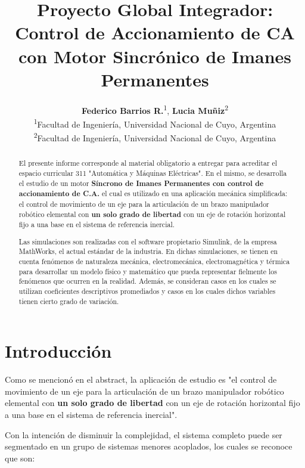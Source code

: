 \documentclass[blue,fullpaper]{ludusofficial}  %
\title{Proyecto Global Integrador: Control de Accionamiento de CA con Motor Sincrónico de Imanes Permanentes}
\author{%
    \textbf{Federico Barrios R.}\textsuperscript{1}, \textbf{Lucia Muñiz}\textsuperscript{2}\\[0.2cm]
    \mdseries\small\textsuperscript{1}Facultad de Ingeniería, Universidad Nacional de Cuyo, Argentina\\
    \small\textsuperscript{2}Facultad de Ingeniería, Universidad Nacional de Cuyo, Argentina \\
}
\begin{document}
\begin{abstract}
El presente informe corresponde al material obligatorio a entregar para acreditar el espacio curricular 311 "Automática y Máquinas Eléctricas". En el mismo, se desarrolla el estudio de un motor \textbf{Síncrono de Imanes Permanentes con control de accionamiento de C.A.} el cual es utilizado en una aplicación mecánica simplificada: el control de movimiento de un eje para la articulación de un brazo manipulador robótico elemental con \textbf{un solo grado de libertad} con un eje de rotación horizontal fijo a una base en el sistema de referencia inercial.

Las simulaciones son realizadas con el software propietario Simulink, de la empresa MathWorks, el actual estándar de la industria. En dichas simulaciones, se tienen en cuenta fenómenos de naturaleza mecánica, electromecánica, electromagnética y térmica para desarrollar un modelo físico y matemático que pueda representar fielmente los fenómenos que ocurren en la realidad. Además, se consideran casos en los cuales se utilizan coeficientes descriptivos promediados y casos en los cuales dichos variables tienen cierto grado de variación.

\end{abstract}


\maketitle

\onecolumn
\tableofcontents
\clearpage

\newpage

\section{Introducción}

Como se mencionó en el abstract, la aplicación de estudio es "el control de movimiento de un eje para la articulación de un brazo manipulador robótico elemental con \textbf{un solo grado de libertad} con un eje de rotación horizontal fijo a una base en el sistema de referencia inercial".

Con la intención de disminuir la complejidad, el sistema completo puede ser segmentado en un grupo de sistemas menores acoplados, los cuales se reconoce que son:
\end{document}
